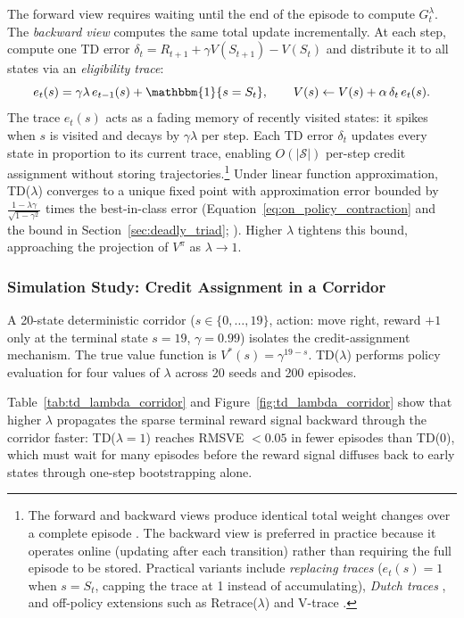 The forward view requires waiting until the end of the episode to compute $G_t^\lambda$. The \emph{backward view} computes the same total update incrementally. At each step, compute one TD error $\delta_t = R_{t+1} + \gamma V(S_{t+1}) - V(S_t)$ and distribute it to all states via an \emph{eligibility trace}:
\begin{equation}
e_t(s) = \gamma\lambda\, e_{t-1}(s) + \mathbbm{1}\{s = S_t\}, \qquad V(s) \leftarrow V(s) + \alpha\,\delta_t\,e_t(s).
\label{eq:eligibility_trace}
\end{equation}
The trace $e_t(s)$ acts as a fading memory of recently visited states: it spikes when $s$ is visited and decays by $\gamma\lambda$ per step. Each TD error $\delta_t$ updates every state in proportion to its current trace, enabling $O(|\mathcal{S}|)$ per-step credit assignment without storing trajectories.\footnote{The forward and backward views produce identical total weight changes over a complete episode \citep{sutton1988}. The backward view is preferred in practice because it operates online (updating after each transition) rather than requiring the full episode to be stored. Practical variants include \emph{replacing traces} ($e_t(s) = 1$ when $s = S_t$, capping the trace at 1 instead of accumulating), \emph{Dutch traces} \citep{vanseijen2016}, and off-policy extensions such as Retrace($\lambda$) \citep{munos2016retrace} and V-trace \citep{espeholt2018impala}.}
Under linear function approximation, TD($\lambda$) converges to a unique fixed point with approximation error bounded by $\frac{1-\lambda\gamma}{\sqrt{1-\gamma^2}}$ times the best-in-class error (Equation~\ref{eq:on_policy_contraction} and the bound in Section~\ref{sec:deadly_triad}; \citealp{tsitsiklis1997}). Higher $\lambda$ tightens this bound, approaching the projection of $V^\pi$ as $\lambda \to 1$.

\subsubsection{Simulation Study: Credit Assignment in a Corridor}
\label{sec:sim_td_lambda_corridor}

A 20-state deterministic corridor ($s \in \{0, \ldots, 19\}$, action: move right, reward $+1$ only at the terminal state $s = 19$, $\gamma = 0.99$) isolates the credit-assignment mechanism. The true value function is $V^*(s) = \gamma^{19-s}$. TD($\lambda$) performs policy evaluation for four values of $\lambda$ across 20 seeds and 200 episodes.

Table~\ref{tab:td_lambda_corridor} and Figure~\ref{fig:td_lambda_corridor} show that higher $\lambda$ propagates the sparse terminal reward signal backward through the corridor faster: TD($\lambda = 1$) reaches RMSVE $< 0.05$ in fewer episodes than TD(0), which must wait for many episodes before the reward signal diffuses back to early states through one-step bootstrapping alone.

